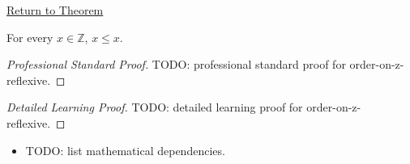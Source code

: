 \newpage
{}
\label{prf:order-on-z-reflexive}

\begin{remark*}[Return]
\hyperref[thm:order-on-z-reflexive]{Return to Theorem}
\end{remark*}

\begin{theorem*}
For every $x\in\mathbb{Z}$, $x\le x$.
\end{theorem*}

\begin{proof}[Professional Standard Proof]
\LRAProofBodyStart
TODO: professional standard proof for order-on-z-reflexive.
\end{proof}

\begin{proof}[Detailed Learning Proof]
\LRAProofBodyStart
TODO: detailed learning proof for order-on-z-reflexive.
\end{proof}

\begin{remark*}
\end{remark*}

\begin{dependencies}
\begin{itemize}
  \item TODO: list mathematical dependencies.
\end{itemize}
\end{dependencies}

\clearpage
